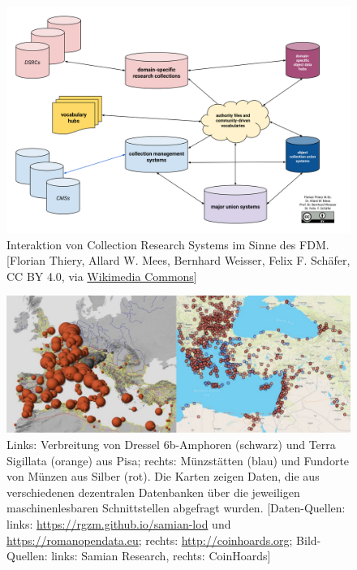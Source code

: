 \documentclass[9pt,academicons]{article}
\begin{document}
\begin{figure}[ht]
 \begin{center}
  \includegraphics[scale=0.6]{img/Collection_Research_Network.png}
  \caption{Interaktion von Collection Research Systems im Sinne des FDM. [Florian Thiery, Allard W. Mees, Bernhard Weisser, Felix F. Schäfer, CC BY 4.0, via \href{https://commons.wikimedia.org/wiki/File:Collection_Research_Network.png}{Wikimedia Commons}]}
  \label{fig:network}
 \end{center}
\end{figure}

\begin{figure}
 \begin{center}
  \includegraphics[scale=0.75]{img/map.pdf}
  \caption{Links: Verbreitung von Dressel 6b-Amphoren (schwarz) und Terra Sigillata (orange) aus Pisa; rechts: Münzstätten (blau) und Fundorte von Münzen aus Silber (rot). Die Karten zeigen Daten, die aus verschiedenen dezentralen Datenbanken über die jeweiligen  maschinenlesbaren Schnittstellen abgefragt wurden. [Daten-Quellen: links: \url{https://rgzm.github.io/samian-lod} und \url{https://romanopendata.eu}; rechts: \url{http://coinhoards.org}; Bild-Quellen: links: Samian Research, rechts: CoinHoards]}
  \label{fig:map}
 \end{center}
\end{figure}

\bigskip
\end{document}
